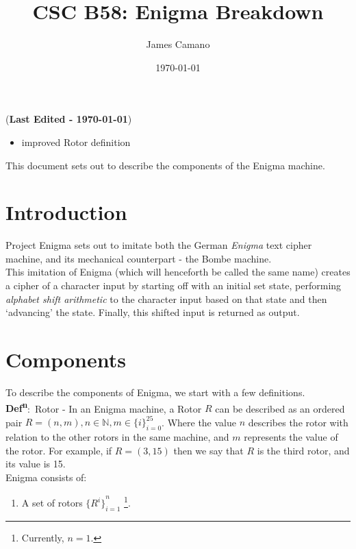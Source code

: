 \documentclass[12pt,a4paper]{article}
\title{CSC B58: Enigma Breakdown}
\date{\today}
\author{James Camano}
\newcommand{\lastedited}{(\textbf{Last Edited - \today{}})}
\newcommand{\defn}[1]{\textbf{Def\textsuperscript{n}}:\ #1 - }
\newcommand{\validshifts}{\{i\}_{i=0}^{25}}
\begin{document}
	\maketitle
	\lastedited
	\begin{itemize}
		\item improved Rotor definition
	\end{itemize}

	This document sets out to describe the components of the Enigma machine. \\
	\section{Introduction}
 	Project Enigma sets out to imitate both the German \emph{Enigma} text cipher machine, and its mechanical counterpart - the Bombe machine.  \\

	This imitation of Enigma (which will henceforth be called the same name) creates a cipher of a character input by starting off with an initial set state, performing \emph{alphabet shift arithmetic} to the character input based on that state and then `advancing' the state. Finally, this shifted input is returned as output.
	
	\section{Components}
	To describe the components of Enigma, we start with a few definitions. \\

	\defn{Rotor} In an Enigma machine, a Rotor $R$ can be described as an ordered pair $R = (n, m),  n \in \mathbb{N},  m \in \validshifts$. Where the value $n$ describes the rotor with relation to the other rotors in the same machine, and $m$ represents the value of the rotor. For example, if $R = (3, 15)$ then we say that $R$ is the third rotor, and its value is 15. \\

	Enigma consists of:

	\begin{enumerate}
		\item A set of rotors ${\{R^i\}}_{i=1}^{n}$ \footnote{Currently, $n=1$. }. 
	\end{enumerate}
\end{document}

